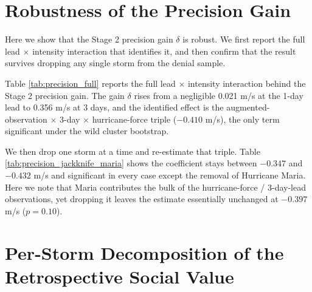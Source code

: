 \documentclass[12pt]{article}%
\begin{document}
\begin{appendices}
\clearpage







\clearpage


\section{Robustness of the Precision Gain} \label{app:delta}

Here we show that the Stage 2 precision gain $\delta$ is robust. We first report the full lead $\times$ intensity interaction that identifies it, and then confirm that the result survives dropping any single storm from the denial sample.

Table \ref{tab:precision_full} reports the full lead $\times$ intensity interaction behind the Stage 2 precision gain. The gain $\delta$ rises from a negligible 0.021 m/s at the 1-day lead to 0.356 m/s at 3 days, and the identified effect is the augmented-observation $\times$ 3-day $\times$ hurricane-force triple ($-0.410$ m/s), the only term significant under the wild cluster bootstrap.

We then drop one storm at a time and re-estimate that triple. Table \ref{tab:precision_jackknife_maria} shows the coefficient stays between $-0.347$ and $-0.432$ m/s and significant in every case except the removal of Hurricane Maria. Here we note that Maria contributes the bulk of the hurricane-force / 3-day-lead observations, yet dropping it leaves the estimate essentially unchanged at $-0.397$ m/s ($p = 0.10$).

\clearpage





\clearpage

\section{Per-Storm Decomposition of the Retrospective Social Value} \label{app:per-storm}


\end{appendices}
\end{document}
